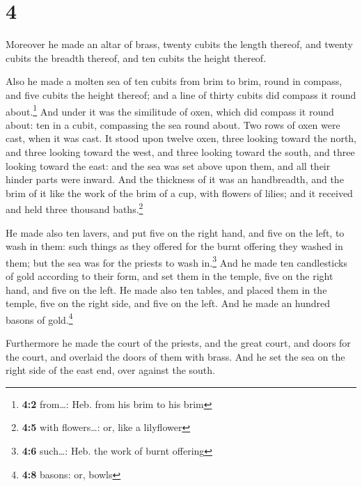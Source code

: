 \hypertarget{section-3}{%
\section{4}\label{section-3}}

 Moreover he made an altar of brass, twenty cubits the
length thereof, and twenty cubits the breadth thereof, and ten cubits
the height thereof.

 Also he made a molten sea of ten cubits from brim to
brim, round in compass, and five cubits the height thereof; and a line
of thirty cubits did compass it round about.\footnote{\textbf{4:2}
  from\ldots: Heb. from his brim to his brim}  And under
it was the similitude of oxen, which did compass it round about: ten in
a cubit, compassing the sea round about. Two rows of oxen were cast,
when it was cast.  It stood upon twelve oxen, three
looking toward the north, and three looking toward the west, and three
looking toward the south, and three looking toward the east: and the sea
was set above upon them, and all their hinder parts were inward.
 And the thickness of it was an handbreadth, and the brim
of it like the work of the brim of a cup, with flowers of lilies; and it
received and held three thousand baths.\footnote{\textbf{4:5} with
  flowers\ldots: or, like a lilyflower}

 He made also ten lavers, and put five on the right hand,
and five on the left, to wash in them: such things as they offered for
the burnt offering they washed in them; but the sea was for the priests
to wash in.\footnote{\textbf{4:6} such\ldots: Heb. the work of burnt
  offering}  And he made ten candlesticks of gold
according to their form, and set them in the temple, five on the right
hand, and five on the left.  He made also ten tables, and
placed them in the temple, five on the right side, and five on the left.
And he made an hundred basons of gold.\footnote{\textbf{4:8} basons: or,
  bowls}

 Furthermore he made the court of the priests, and the
great court, and doors for the court, and overlaid the doors of them
with brass.  And he set the sea on the right side of the
east end, over against the south.

